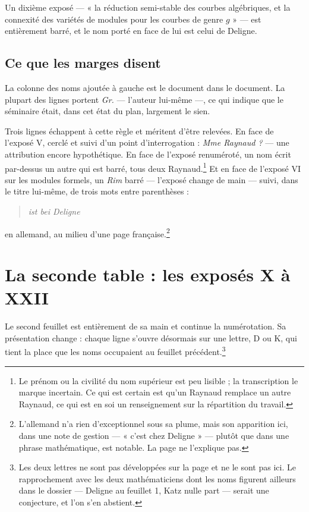 \documentclass[11pt,a4paper]{article}
\begin{document}
Un dixième exposé --- « la réduction semi-stable des courbes algébriques, et la
connexité des variétés de modules pour les courbes de genre $g$ » --- est
entièrement barré, et le nom porté en face de lui est celui de Deligne.

\subsection*{Ce que les marges disent}

La colonne des noms ajoutée à gauche est le document dans le document. La
plupart des lignes portent \emph{Gr.} --- l'auteur lui-même ---, ce qui indique
que le séminaire était, dans cet état du plan, largement le sien.

Trois lignes échappent à cette règle et méritent d'être relevées. En face de
l'exposé V, cerclé et suivi d'un point d'interrogation : \emph{Mme Raynaud ?}
--- une attribution encore hypothétique. En face de l'exposé renuméroté, un nom
écrit par-dessus un autre qui est barré, tous deux Raynaud.\footnote{Le prénom
ou la civilité du nom supérieur est peu lisible ; la transcription le marque
incertain. Ce qui est certain est qu'un Raynaud remplace un autre Raynaud, ce
qui est en soi un renseignement sur la répartition du travail.} Et en face de
l'exposé VI sur les modules formels, un \emph{Rim} barré --- l'exposé change de
main --- suivi, dans le titre lui-même, de trois mots entre parenthèses :

\begin{quote}
\emph{ist bei Deligne}
\end{quote}

en allemand, au milieu d'une page française.\footnote{L'allemand n'a rien
d'exceptionnel sous sa plume, mais son apparition ici, dans une note de
gestion --- « c'est chez Deligne » --- plutôt que dans une phrase mathématique,
est notable. La page ne l'explique pas.}

\section*{La seconde table : les exposés X à XXII}

Le second feuillet est entièrement de sa main et continue la numérotation. Sa
présentation change : chaque ligne s'ouvre désormais sur une lettre, D ou K, qui
tient la place que les noms occupaient au feuillet précédent.\footnote{Les deux
lettres ne sont pas développées sur la page et ne le sont pas ici. Le
rapprochement avec les deux mathématiciens dont les noms figurent ailleurs dans
le dossier --- Deligne au feuillet 1, Katz nulle part --- serait une conjecture,
et l'on s'en abstient.}
\end{document}
